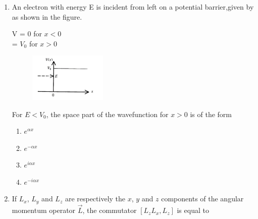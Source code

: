 \documentclass[journal,12pt,onecolumn]{IEEEtran}
\begin{document}
\begin{enumerate}
\hfill{}

\begin{multicols}{4}
\begin{enumerate}
    \item $I_{2} = I_{3}, \ I_{1} \neq I_{2}$
    \item $I_{1} = I_{y}, \ I_{1} \neq I_{2}$
    \item $I_{1} = I_{2}, \ I_{1} \neq I_{3}$
    \item $I_{1} = I_{2} \neq I_{3}$
\end{enumerate}
\end{multicols}


\newpage

\item An electron with energy E is incident from left on a potential barrier,given by as shown in the figure. 


\begin{center}
    V = 0  for $x < 0$\\
    = $V_0$ for $x > 0$
\end{center}


\begin{figure}[ht!]
    \centering
    \includegraphics[width=0.35\textwidth]{fig1.jpeg}
    \caption{}
    \label{fig:fig1.jpeg}
\end{figure}

For $E<V_0$, the space part of the wavefunction for $x>0$ is of the form

\hfill{}

\begin{multicols}{4}
\begin{enumerate}
    \item $e^{\alpha x}$
    \item $e^{-\alpha x}$
    \item $e^{i\alpha x}$
    \item $e^{-i\alpha x}$
\end{enumerate}
\end{multicols}

\item If $L_{x}$, $L_{y}$ and $L_{z}$ are respectively the $x$, $y$ and $z$ components of the angular momentum operator $\vec{L}$, the commutator $[L_{z} L_{x}, L_{z}]$ is equal to


\end{enumerate}
\end{document}
